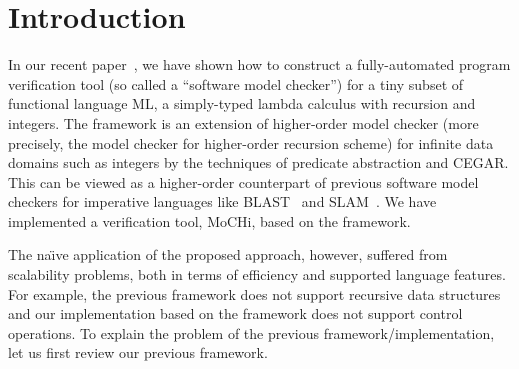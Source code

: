 \vspace{-5pt}
\section{Introduction}
\label{sec:intro}

In our recent paper~\cite{KobayashiPLDI2011}, we have shown how to
construct a fully-automated program verification tool (so called a
``software model checker'') for a tiny subset of functional language ML, a
simply-typed lambda calculus with recursion and integers.
The framework is an extension of higher-order model checker
(more precisely, the model checker for higher-order recursion scheme)
for infinite data domains such as integers by the techniques of
predicate abstraction and CEGAR.  This can be viewed as a higher-order
counterpart of previous software model checkers for imperative languages
like BLAST~\cite{Henzinger2002} and SLAM~\cite{Ball2002}.
We have implemented a verification tool, MoCHi, based on the framework.

The na\"{\i}ve application of the proposed approach, however, suffered
from scalability problems, both in terms of efficiency and supported
language features. For example, the previous framework does not support
recursive data structures and our implementation based on the framework
does not support control operations.  To explain the problem of the
previous framework/implementation, let us first review our previous
framework.

